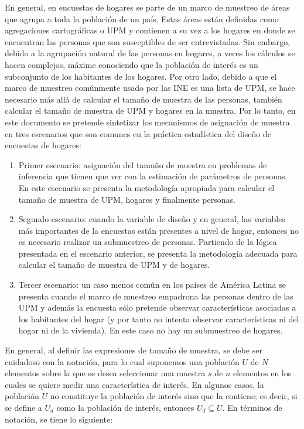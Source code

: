 \documentclass[
  12pt,
  spanish,
]{book}
\begin{document}
En general, en encuestas de hogares se parte de un marco de muestreo de áreas que agrupa a toda la población de un país. Estas áreas están definidas como agregaciones cartográficas o UPM y contienen a su vez a los hogares en donde se encuentran las personas que son susceptibles de ser entrevistadas. Sin embargo, debido a la agrupación natural de las personas en hogares, a veces los cálculos se hacen complejos, máxime conociendo que la población de interés es un subconjunto de los habitantes de los hogares. Por otro lado, debido a que el marco de muestreo comúnmente usado por las INE es una lista de UPM, se hace necesario más allá de calcular el tamaño de muestra de las personas, también calcular el tamaño de muestra de UPM y hogares en la muestra. Por lo tanto, en este documento se pretende sintetizar los mecanismos de asignación de muestra en tres escenarios que son comunes en la práctica estadística del diseño de encuestas de hogares:

\begin{enumerate}
\def\labelenumi{\arabic{enumi}.}
\item
  Primer escenario: asignación del tamaño de muestra en problemas de inferencia que tienen que ver con la estimación de parámetros de personas. En este escenario se presenta la metodología apropiada para calcular el tamaño de muestra de UPM, hogares y finalmente personas.
\item
  Segundo escenario: cuando la variable de diseño y en general, las variables más importantes de la encuestas están presentes a nivel de hogar, entonces no es necesario realizar un submuestreo de personas. Partiendo de la lógica presentada en el escenario anterior, se presenta la metodología adecuada para calcular el tamaño de muestra de UPM y de hogares.
\item
  Tercer escenario: un caso menos común en los países de América Latina se presenta cuando el marco de muestreo empadrona las personas dentro de las UPM y además la encuesta sólo pretende observar características asociadas a los habitantes del hogar (y por tanto no intenta observar características ni del hogar ni de la vivienda). En este caso no hay un submuestreo de hogares.
\end{enumerate}

En general, al definir las expresiones de tamaño de muestra, se debe ser cuidadoso con la notación, para lo cual suponemos una población \(U\) de \(N\) elementos sobre la que se desea seleccionar una muestra \(s\) de \(n\) elementos en los cuales se quiere medir una característica de interés. En algunos casos, la población \(U\) no constituye la población de interés sino que la contiene; es decir, si se define a \(U_d\) como la población de interés, entonces \(U_d \subseteq U\). En términos de notación, se tiene lo siguiente:
\end{document}

